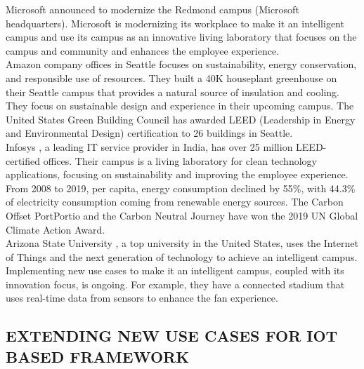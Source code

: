 \documentclass[conference]{IEEEtran}
\begin{document}
Microsoft \cite{INTCAMPUS:MicrosoftReport} announced to modernize the Redmond campus (Microsoft headquarters). Microsoft is modernizing its workplace to make it an intelligent campus and use its campus as an innovative living laboratory that focuses on the campus and community and enhances the employee experience. \\ 

Amazon \cite{INTCAMPUS:AmazonReport} company offices in Seattle focuses on sustainability, energy conservation, and responsible use of resources. They built a 40K houseplant greenhouse on their Seattle campus that provides a natural source of insulation and cooling. They focus on sustainable design and experience in their upcoming campus. The United States Green Building Council has awarded LEED (Leadership in Energy and Environmental Design) certification to 26 buildings in Seattle. \\

Infosys \cite{INTCAMPUS:InfosysReport}, a leading IT service provider in India, has over 25 million LEED-certified offices. Their campus is a living laboratory for clean technology applications, focusing on sustainability and improving the employee experience. From 2008 to 2019, per capita, energy consumption declined by 55\%, with 44.3\% of electricity consumption coming from renewable energy sources. The Carbon Offset PortPortio and the Carbon Neutral Journey have won the 2019 UN Global Climate Action Award.  \\

Arizona State University \cite{INTCAMPUS:ArizonaBuiltCampus}, a top university in the United States, uses the Internet of Things and the next generation of technology to achieve an intelligent campus. Implementing new use cases to make it an intelligent campus, coupled with its innovation focus, is ongoing. For example, they have a connected stadium that uses real-time data from sensors to enhance the fan experience. \\


\subsection{EXTENDING NEW USE CASES FOR IOT BASED FRAMEWORK}
\end{document}
